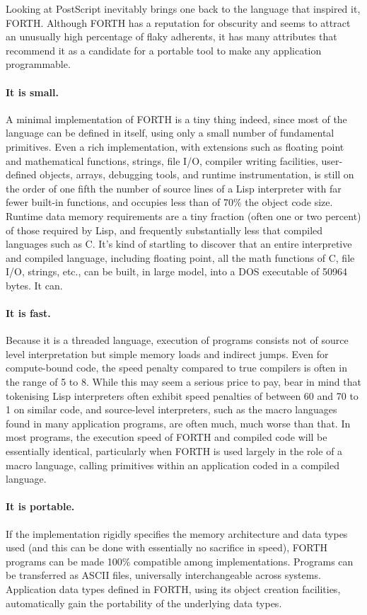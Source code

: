 \documentclass[twocolumn]{article}
\begin{document}
Looking at PostScript inevitably brings one back to the language
that inspired it, FORTH\@.  Although FORTH has a reputation for
obscurity and seems to attract an unusually high percentage of flaky
adherents, it has many attributes that recommend it as a candidate for
a portable tool to make any application programmable.

\paragraph{It is small.} A minimal implementation of FORTH is a tiny
thing indeed, since most of the language can be defined in itself,
using only a small number of fundamental primitives.  Even a rich
implementation, with extensions such as floating point and
mathematical functions, strings, file I/O, compiler writing
facilities, user-defined objects, arrays, debugging tools, and
runtime instrumentation, is still on the order of one fifth the number
of source lines of a Lisp interpreter with far fewer built-in
functions, and occupies less than of 70\% the object code size.  Runtime
data memory requirements are a tiny fraction (often one or two percent) of
those required by Lisp, and frequently substantially less that
compiled languages such as C\@.  It's kind of startling to discover
that an entire interpretive and compiled language, including floating
point, all the math functions of C, file I/O, strings, etc., can be
built, in large model, into a DOS executable of 50964 bytes.  It can.

\paragraph{It is fast.}  Because it is a threaded language, execution
of programs consists not of source level interpretation but simple
memory loads and indirect jumps.  Even for compute-bound code, the
speed penalty compared to true compilers is often in the range of 5 to
8.
While this may seem a serious price to pay, bear in
mind that tokenising Lisp interpreters often exhibit speed penalties
of between 60 and 70 to 1 on similar code, and source-level
interpreters, such as the macro languages found in many application
programs, are often much, much worse than that.  In most programs, the
execution speed of FORTH and compiled code will be essentially
identical, particularly when FORTH is used largely in the role of a
macro language, calling primitives within an application coded in a
compiled language.

\paragraph{It is portable.}  If the implementation rigidly specifies
the memory architecture and data types used (and this can be done with
essentially no sacrifice in speed), FORTH programs can be made 100\%
compatible among implementations.  Programs can be transferred as
ASCII files, universally interchangeable across systems.
Application data types defined in FORTH, using its object creation
facilities, automatically gain the portability of the underlying
data types.
\end{document}
